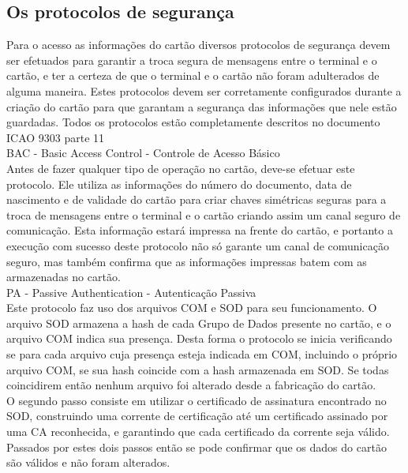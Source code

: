 \documentclass{article}
\begin{document}
	\subsection{Os protocolos de segurança}
		\begin{justify}
			\hspace{2cm}Para o acesso as informações do cartão diversos protocolos de segurança devem ser efetuados para garantir a troca segura de mensagens entre o terminal e o cartão, e ter a certeza de que o terminal e o cartão não foram adulterados de alguma maneira. Estes protocolos devem ser corretamente configurados durante a criação do cartão para que garantam a segurança das informações que nele estão guardadas. Todos os protocolos estão completamente descritos no documento ICAO 9303 parte 11\\

			\hspace*{2cm} BAC - Basic Access Control - Controle de Acesso Básico\\
			\hspace*{2cm} Antes de fazer qualquer tipo de operação no cartão, deve-se efetuar este protocolo. Ele utiliza as informações do número do documento, data de nascimento e de validade do cartão para criar chaves simétricas seguras para a troca de mensagens entre o terminal e o cartão criando assim um canal seguro de comunicação. Esta informação estará impressa na frente do cartão, e portanto a execução com sucesso deste protocolo não só garante um canal de comunicação seguro, mas também confirma que as informações impressas batem com as armazenadas no cartão.\\
			
			\hspace*{2cm} PA - Passive Authentication - Autenticação Passiva\\
			\hspace*{2cm} Este protocolo faz uso dos arquivos COM e SOD para seu funcionamento. O arquivo SOD armazena a hash de cada Grupo de Dados presente no cartão, e o arquivo COM indica sua presença. Desta forma o protocolo se inicia verificando se para cada arquivo cuja presença esteja indicada em COM, incluindo o próprio arquivo COM, se sua hash coincide com a hash armazenada em SOD. Se todas coincidirem então nenhum arquivo foi alterado desde a fabricação do cartão.\\
			\hspace*{2cm} O segundo passo consiste em utilizar o certificado de assinatura encontrado no SOD, construindo uma corrente de certificação até um certificado assinado por uma CA reconhecida, e garantindo que cada certificado da corrente seja válido. Passados por estes dois passos então se pode confirmar que os dados do cartão são válidos e não foram alterados.\\
			

\end{justify}
\end{document}
